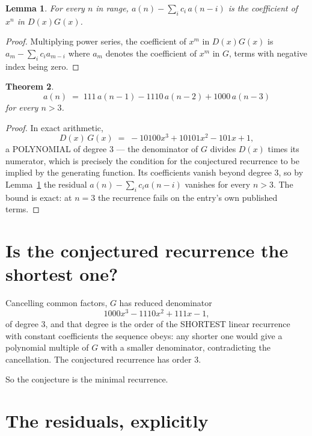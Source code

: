 \documentclass[11pt,a4paper]{article}
\theoremstyle{plain}
\newtheorem{theorem}{Theorem}
\newtheorem{lemma}[theorem]{Lemma}
\theoremstyle{definition}
\begin{document}
\begin{lemma}\label{lem:key}
For every $n$ in range, $a(n)-\sum_i c_i\,a(n-i)$ is the coefficient of $x^{n}$ in
$D(x)G(x)$.
\end{lemma}

\begin{proof}
Multiplying power series, the coefficient of $x^{m}$ in $D(x)G(x)$ is
$a_m-\sum_i c_i a_{m-i}$ where $a_m$ denotes the coefficient of $x^{m}$ in $G$, terms with
negative index being zero.
\end{proof}

\begin{theorem}
\[
a(n)\;=\;111\,a(n-1) - 1110\,a(n-2) + 1000\,a(n-3)
\]
for every $n>3$.
\end{theorem}

\begin{proof}
In exact arithmetic,
\[
D(x)\,G(x)\;=\;- 10100 x^{3} + 10101 x^{2} - 101 x + 1,
\]
a POLYNOMIAL of degree $3$ --- the denominator of $G$ divides $D(x)$ times its numerator,
which is precisely the condition for the conjectured recurrence to be implied by the
generating function. Its coefficients vanish beyond degree $3$, so by
Lemma~\ref{lem:key} the residual $a(n)-\sum_ic_ia(n-i)$ vanishes for every
$n>3$. The bound is exact: at $n=3$ the recurrence fails on the entry's own published terms.
\end{proof}

\section{Is the conjectured recurrence the shortest one?}

Cancelling common factors, $G$ has reduced denominator
\[
1000 x^{3} - 1110 x^{2} + 111 x - 1,
\]
of degree $3$, and that degree is the order of the SHORTEST linear recurrence with
constant coefficients the sequence obeys: any shorter one would give a polynomial multiple of
$G$ with a smaller denominator, contradicting the cancellation. The conjectured recurrence has
order $3$.

So the conjecture is the minimal recurrence.

\section{The residuals, explicitly}
\end{document}
